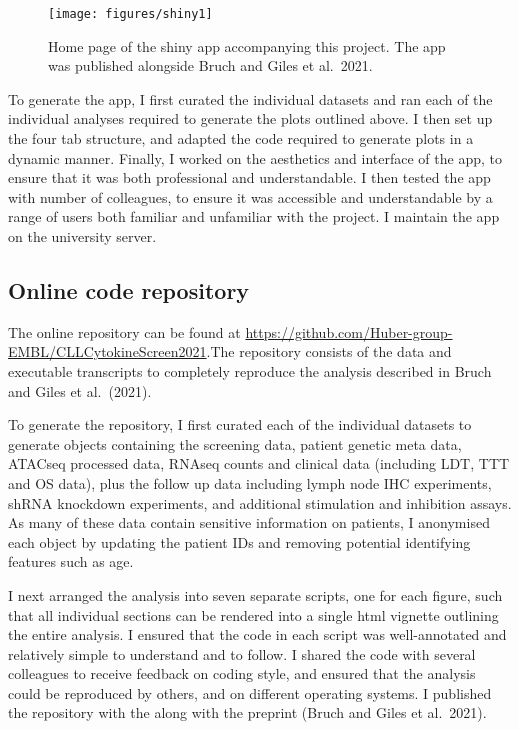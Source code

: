 \documentclass[11pt, a4paper, twosided]{book}
\begin{document}
\begin{figure}

{\centering \texttt{[image: figures/shiny1]} 

}

\caption{Home page of the shiny app accompanying this project. The app was published alongside Bruch and Giles et al.~2021.}\label{fig:shinyApp1}
\end{figure}
To generate the app, I first curated the individual datasets and ran each of the individual analyses required to generate the plots outlined above. I then set up the four tab structure, and adapted the code required to generate plots in a dynamic manner. Finally, I worked on the aesthetics and interface of the app, to ensure that it was both professional and understandable. I then tested the app with number of colleagues, to ensure it was accessible and understandable by a range of users both familiar and unfamiliar with the project. I maintain the app on the university server.

\hypertarget{online-code-repository}{%
\subsection{Online code repository}\label{online-code-repository}}

The online repository can be found at \url{https://github.com/Huber-group-EMBL/CLLCytokineScreen2021}.The repository consists of the data and executable transcripts to completely reproduce the analysis described in Bruch and Giles et al.~(2021).

To generate the repository, I first curated each of the individual datasets to generate objects containing the screening data, patient genetic meta data, ATACseq processed data, RNAseq counts and clinical data (including LDT, TTT and OS data), plus the follow up data including lymph node IHC experiments, shRNA knockdown experiments, and additional stimulation and inhibition assays. As many of these data contain sensitive information on patients, I anonymised each object by updating the patient IDs and removing potential identifying features such as age.

I next arranged the analysis into seven separate scripts, one for each figure, such that all individual sections can be rendered into a single html vignette outlining the entire analysis. I ensured that the code in each script was well-annotated and relatively simple to understand and to follow. I shared the code with several colleagues to receive feedback on coding style, and ensured that the analysis could be reproduced by others, and on different operating systems. I published the repository with the along with the preprint (Bruch and Giles et al.~2021).
\end{document}
